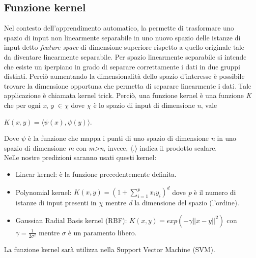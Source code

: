 \subsection{Funzione kernel}
Nel contesto dell'apprendimento automatico, la \textit{\cite{kernel}} permette di trasformare uno spazio di input non linearmente separabile in uno nuovo spazio delle istanze di input detto \emph{feature space} di dimensione superiore rispetto a quello originale tale da diventare linearmente separabile. Per spazio linearmente separabile si intende che esiste un iperpiano in grado di separare correttamente i dati in due gruppi distinti. Perciò aumentando la dimensionalità dello spazio d'interesse è possibile trovare la dimensione opportuna che permetta di separare linearmente i dati. Tale applicazione è chiamata kernel trick. Perciò, una funzione kernel è una funzione \emph{K} che per ogni \emph{x}, \emph{y} $\in \chi$ dove $\chi$ è lo spazio di input di dimensione \emph{n}, vale 
\begin{center}
	$K(x,y) =  \langle\psi(x),\psi(y)\rangle $.
\end{center}
Dove $\psi$ è la funzione che mappa i punti di uno spazio di dimensione \emph{n} in uno spazio di dimensione \emph{m} con \emph{m>n}, invece, $\langle . \rangle$ indica il prodotto scalare.\\
Nelle nostre predizioni saranno usati questi kernel:
\begin{itemize}
	\item Linear kernel: è la funzione precedentemente definita.
	\item Polynomial kernel: $K(x,y) =  \left(1 + \sum_{i = 1}^{p}x_iy_i\right)^{d} $ dove \emph{p} è il numero di istanze di input presenti in $\chi$ mentre \emph{d} la dimensione del spazio (l'ordine).
	\item Gaussian Radial Basis kernel (RBF): $K(x,y) = exp(-\gamma||x-y||^2) $ con $\gamma=\frac{1}{2\sigma^2}$ mentre $\sigma$ è un paramento libero. 
\end{itemize}
La funzione kernel sarà utilizza nella Support Vector Machine (SVM).
